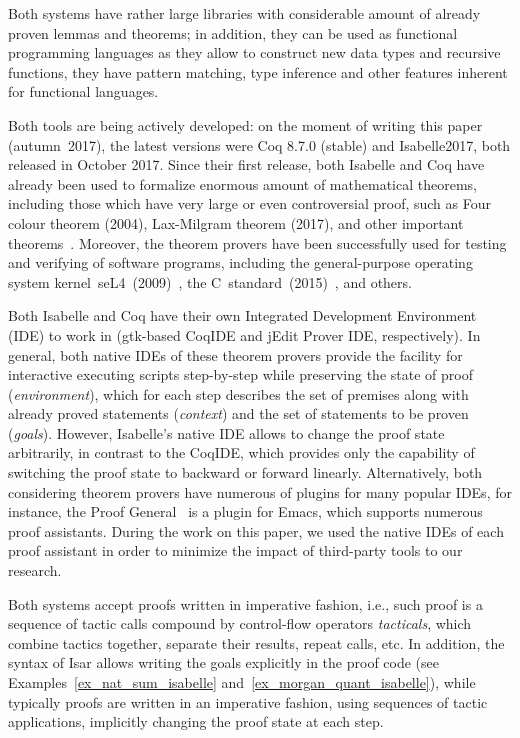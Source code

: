\documentclass[article]{aaltoseries}
\begin{document}
Both systems have rather large libraries with considerable amount of already proven lemmas and theorems; in addition, they can be used as functional programming languages as they allow to construct new data types and recursive functions, they have pattern matching, type inference and other features inherent for functional languages.

Both tools are being actively developed: on the moment of writing this paper (autumn~2017), the latest versions were Coq 8.7.0 (stable) and Isabelle2017, both released in October 2017. Since their first release, both Isabelle and Coq have already been used to formalize enormous amount of mathematical theorems, including those which have very large or even controversial proof, such as Four colour theorem (2004), Lax-Milgram theorem (2017), and other important theorems~\cite{Wiedijk100}. Moreover, the theorem provers have been successfully used for testing and verifying of software programs, including the general-purpose operating system kernel~seL4~(2009)~\cite{Klein09}, the C~standard~(2015)~\cite{Krebbers15}, and others.

Both Isabelle and Coq have their own Integrated Development Environment (IDE) to work in (gtk-based CoqIDE and jEdit Prover IDE, respectively). In general, both native IDEs of these theorem provers provide the facility for interactive executing scripts step-by-step while preserving the state of proof (\textit{environment}), which for each step describes the set of premises along with already proved statements (\textit{context}) and the set of statements to be proven (\textit{goals}). However, Isabelle's native IDE allows to change the proof state arbitrarily, in contrast to the CoqIDE, which provides only the capability of switching the proof state to backward or forward linearly. Alternatively, both considering theorem provers have numerous of plugins for many popular IDEs, for instance, the Proof General~\cite{tool_PG} is a plugin for Emacs, which supports numerous proof assistants. During the work on this paper, we used the native IDEs of each proof assistant in order to minimize the impact of third-party tools to our research.

Both systems accept proofs written in imperative fashion, i.e., such proof is a sequence of tactic calls compound by control-flow operators \textit{tacticals}, which combine tactics together, separate their results, repeat calls, etc. In addition, the syntax of Isar allows writing the goals explicitly in the proof code (see Examples~\ref{ex_nat_sum_isabelle} and~\ref{ex_morgan_quant_isabelle}), while typically proofs are written in an imperative fashion, using sequences of tactic applications, implicitly changing the proof state at each step.
\end{document}
